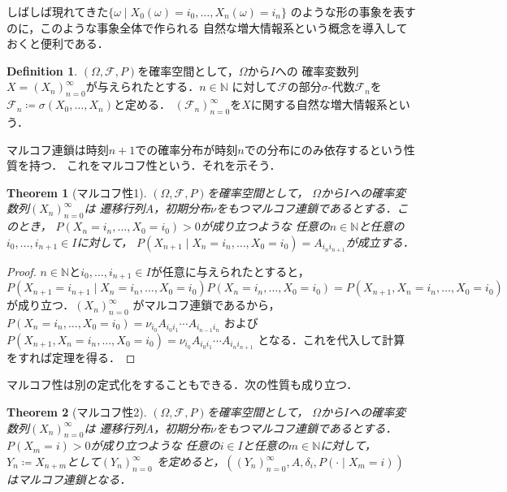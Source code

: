 \documentclass[dvipdfmx,autodetect-engine]{jsarticle}
\newtheorem{theorem}{Theorem}[section]
\theoremstyle{remark}
\theoremstyle{definition}
\newtheorem{definition}{Definition}[section]
\newcommand{\N}{\mathbb{N}}
\begin{document}
しばしば現れてきた$\{ \omega \mid X_0 (\omega)= i_0,\ldots, X_n (\omega)= i_n\}$
のような形の事象を表すのに，このような事象全体で作られる
自然な増大情報系という概念を導入しておくと便利である．
\begin{definition}
    $(\Omega,\mathcal{F},P)$を確率空間として，$\Omega$から$I$への
    確率変数列$X = (X_n)_{n=0}^{\infty}$が与えられたとする．$n \in \N$
    に対して$\mathcal{F}$の部分$\sigma$-代数$\mathcal{F}_n$を
    $\mathcal{F}_n \coloneqq \sigma (X_0,\ldots,X_n)$と定める．
    $(\mathcal{F}_n)_{n =0}^{\infty}$を$X$に関する自然な増大情報系という．
\end{definition}

マルコフ連鎖は時刻$n+1$での確率分布が時刻$n$での分布にのみ依存するという性質を持つ．
これをマルコフ性という．それを示そう．

\begin{theorem}[マルコフ性1]
    $(\Omega,\mathcal{F},P)$を確率空間として，
    $\Omega$から$I$への確率変数列$(X_n)_{n=0}^{\infty}$は
    遷移行列$A$，初期分布$\nu$をもつマルコフ連鎖であるとする．このとき，
    $P(X_n = i_n,\ldots,X_0 = i_0) >0$が成り立つような
    任意の$n \in \N$と任意の$i_0,\ldots,i_{n+1} \in I$に対して，
    $P(X_{n+1} \mid X_n = i_n,\ldots,X_0 = i_0)=A_{i_n i_{n+1}}$が成立する．
\end{theorem}

\begin{proof}
    $n \in \N$と$i_0,\ldots,i_{n+1} \in I$が任意に与えられたとすると，
    $P(X_{n+1}=i_{n+1} \mid X_n = i_n,\ldots,X_0 = i_0)P(X_n = i_n,\ldots,X_0 = i_0) 
    = P(X_{n+1},X_n = i_n,\ldots,X_0 = i_0)$が成り立つ．$(X_n)_{n=0}^{\infty}$
    がマルコフ連鎖であるから，$P(X_n = i_n,\ldots,X_0 = i_0) = \nu_{i_0} A_{i_0 i_1} \cdots A_{i_{n-1} i_n}$
    および$P(X_{n+1},X_n = i_n,\ldots,X_0 = i_0) = \nu_{i_0} A_{i_0 i_1} \cdots A_{i_{n} i_{n+1}}$
    となる．これを代入して計算をすれば定理を得る．
\end{proof}

マルコフ性は別の定式化をすることもできる．次の性質も成り立つ．
\begin{theorem}[マルコフ性2]\label{markov_prop2}
    $(\Omega,\mathcal{F},P)$を確率空間として，
    $\Omega$から$I$への確率変数列$(X_n)_{n=0}^{\infty}$は
    遷移行列$A$，初期分布$\nu$をもつマルコフ連鎖であるとする．
    $P(X_m = i) >0$が成り立つような
    任意の$i \in I$と任意の$m \in \N$に対して，
    $Y_n \coloneqq X_{n+m}$として$(Y_n)_{n=0}^{\infty}$
    を定めると，$((Y_n)_{n=0}^{\infty},A,\delta_i, P(\cdot \mid X_m = i))$
    はマルコフ連鎖となる．
\end{theorem}
\end{document}
